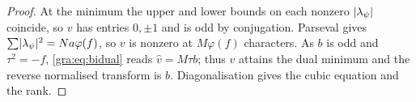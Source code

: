 
\begin{proof}
At the minimum the upper and lower bounds on each nonzero
$\lvert\lambda_\psi\rvert$ coincide, so $v$ has entries $0,\pm1$ and is odd by
conjugation. Parseval gives $\sum\lvert\lambda_\psi\rvert^2=Na\varphi(f)$, so $v$
is nonzero at $M\varphi(f)$ characters. As $b$ is odd and $\tau^2=-f$,
\eqref{gra:eq:bidual} reads $\widehat v=M\tau b$; thus $v$ attains the dual
minimum and the reverse normalised transform is $b$. Diagonalisation gives
the cubic equation and the rank.
\end{proof}

